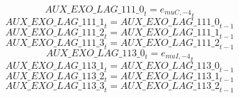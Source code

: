 \begin{dmath}
{AUX\_EXO\_LAG\_111\_0}_{t}={{e_{muC,-4}}}_{t}
\end{dmath}
\begin{dmath}
{AUX\_EXO\_LAG\_111\_1}_{t}={AUX\_EXO\_LAG\_111\_0}_{t-1}
\end{dmath}
\begin{dmath}
{AUX\_EXO\_LAG\_111\_2}_{t}={AUX\_EXO\_LAG\_111\_1}_{t-1}
\end{dmath}
\begin{dmath}
{AUX\_EXO\_LAG\_111\_3}_{t}={AUX\_EXO\_LAG\_111\_2}_{t-1}
\end{dmath}
\begin{dmath}
{AUX\_EXO\_LAG\_113\_0}_{t}={{e_{muI,-4}}}_{t}
\end{dmath}
\begin{dmath}
{AUX\_EXO\_LAG\_113\_1}_{t}={AUX\_EXO\_LAG\_113\_0}_{t-1}
\end{dmath}
\begin{dmath}
{AUX\_EXO\_LAG\_113\_2}_{t}={AUX\_EXO\_LAG\_113\_1}_{t-1}
\end{dmath}
\begin{dmath}
{AUX\_EXO\_LAG\_113\_3}_{t}={AUX\_EXO\_LAG\_113\_2}_{t-1}
\end{dmath}
